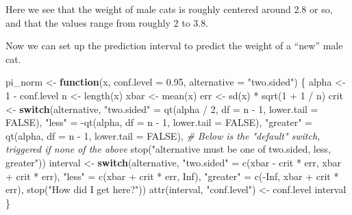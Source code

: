 \documentclass[
]{article}
\newenvironment{Shaded}{\begin{snugshade}}{\end{snugshade}}
\newcommand{\AttributeTok}[1]{\textcolor[rgb]{0.77,0.63,0.00}{#1}}
\newcommand{\CommentTok}[1]{\textcolor[rgb]{0.56,0.35,0.01}{\textit{#1}}}
\newcommand{\ConstantTok}[1]{\textcolor[rgb]{0.00,0.00,0.00}{#1}}
\newcommand{\ControlFlowTok}[1]{\textcolor[rgb]{0.13,0.29,0.53}{\textbf{#1}}}
\newcommand{\DecValTok}[1]{\textcolor[rgb]{0.00,0.00,0.81}{#1}}
\newcommand{\FloatTok}[1]{\textcolor[rgb]{0.00,0.00,0.81}{#1}}
\newcommand{\FunctionTok}[1]{\textcolor[rgb]{0.00,0.00,0.00}{#1}}
\newcommand{\NormalTok}[1]{#1}
\newcommand{\OtherTok}[1]{\textcolor[rgb]{0.56,0.35,0.01}{#1}}
\newcommand{\SpecialCharTok}[1]{\textcolor[rgb]{0.00,0.00,0.00}{#1}}
\newcommand{\StringTok}[1]{\textcolor[rgb]{0.31,0.60,0.02}{#1}}
\begin{document}
Here we see that the weight of male cats is roughly centered around 2.8
or so, and that the values range from roughly 2 to 3.8.

Now we can set up the prediction interval to predict the weight of a
``new'' male cat.

\begin{Shaded}
\begin{Highlighting}[]
\NormalTok{pi\_norm }\OtherTok{\textless{}{-}} \ControlFlowTok{function}\NormalTok{(x, }\AttributeTok{conf.level =} \FloatTok{0.95}\NormalTok{, }\AttributeTok{alternative =} \StringTok{"two.sided"}\NormalTok{) \{}
\NormalTok{  alpha }\OtherTok{\textless{}{-}} \DecValTok{1} \SpecialCharTok{{-}}\NormalTok{ conf.level}
\NormalTok{  n }\OtherTok{\textless{}{-}} \FunctionTok{length}\NormalTok{(x)}
\NormalTok{  xbar }\OtherTok{\textless{}{-}} \FunctionTok{mean}\NormalTok{(x)}
\NormalTok{  err }\OtherTok{\textless{}{-}} \FunctionTok{sd}\NormalTok{(x) }\SpecialCharTok{*} \FunctionTok{sqrt}\NormalTok{(}\DecValTok{1} \SpecialCharTok{+} \DecValTok{1} \SpecialCharTok{/}\NormalTok{ n)}
\NormalTok{  crit }\OtherTok{\textless{}{-}} \ControlFlowTok{switch}\NormalTok{(alternative,}
                 \StringTok{"two.sided"} \OtherTok{=} \FunctionTok{qt}\NormalTok{(alpha }\SpecialCharTok{/} \DecValTok{2}\NormalTok{, }\AttributeTok{df =}\NormalTok{ n }\SpecialCharTok{{-}} \DecValTok{1}\NormalTok{, }\AttributeTok{lower.tail =} \ConstantTok{FALSE}\NormalTok{),}
                 \StringTok{"less"} \OtherTok{=} \SpecialCharTok{{-}}\FunctionTok{qt}\NormalTok{(alpha, }\AttributeTok{df =}\NormalTok{ n }\SpecialCharTok{{-}} \DecValTok{1}\NormalTok{, }\AttributeTok{lower.tail =} \ConstantTok{FALSE}\NormalTok{),}
                 \StringTok{"greater"} \OtherTok{=} \FunctionTok{qt}\NormalTok{(alpha, }\AttributeTok{df =}\NormalTok{ n }\SpecialCharTok{{-}} \DecValTok{1}\NormalTok{, }\AttributeTok{lower.tail =} \ConstantTok{FALSE}\NormalTok{),}
                 \CommentTok{\# Below is the "default" switch, triggered if none of the above}
                 \FunctionTok{stop}\NormalTok{(}\StringTok{"alternative must be one of two.sided, less, greater"}\NormalTok{))}
\NormalTok{  interval }\OtherTok{\textless{}{-}} \ControlFlowTok{switch}\NormalTok{(alternative,}
                     \StringTok{"two.sided"} \OtherTok{=} \FunctionTok{c}\NormalTok{(xbar }\SpecialCharTok{{-}}\NormalTok{ crit }\SpecialCharTok{*}\NormalTok{ err, xbar }\SpecialCharTok{+}\NormalTok{ crit }\SpecialCharTok{*}\NormalTok{ err),}
                     \StringTok{"less"} \OtherTok{=} \FunctionTok{c}\NormalTok{(xbar }\SpecialCharTok{+}\NormalTok{ crit }\SpecialCharTok{*}\NormalTok{ err, }\ConstantTok{Inf}\NormalTok{),}
                     \StringTok{"greater"} \OtherTok{=} \FunctionTok{c}\NormalTok{(}\SpecialCharTok{{-}}\ConstantTok{Inf}\NormalTok{, xbar }\SpecialCharTok{+}\NormalTok{ crit }\SpecialCharTok{*}\NormalTok{ err),}
                     \FunctionTok{stop}\NormalTok{(}\StringTok{"How did I get here?"}\NormalTok{))}
  \FunctionTok{attr}\NormalTok{(interval, }\StringTok{"conf.level"}\NormalTok{) }\OtherTok{\textless{}{-}}\NormalTok{ conf.level}
\NormalTok{  interval}
\NormalTok{\}}


\end{Highlighting}
\end{Shaded}
\end{document}
